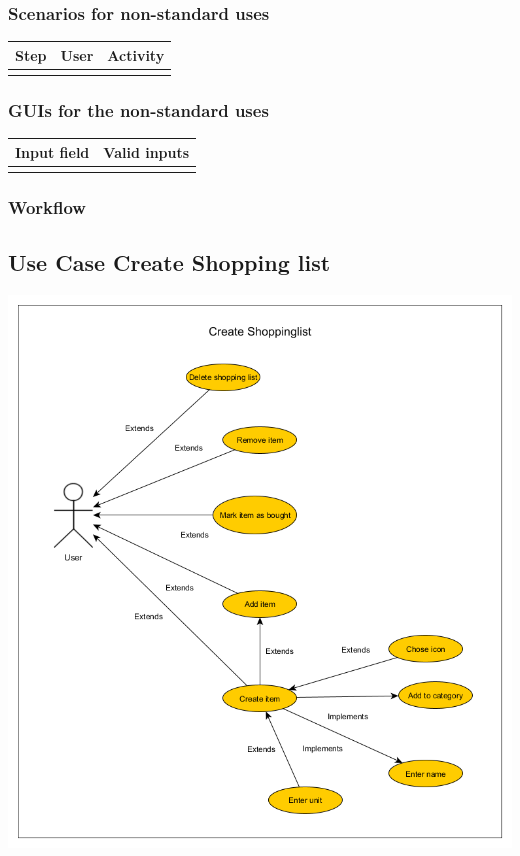 \documentclass[12pt]{article}
\theoremstyle{definition}
\begin{document}
\subsubsection{Scenarios for non-standard uses}

\begin{tabular}{|l|l|l|}
\hline
Step & User & Activity \\ \hline
 & & \\ \hline
\end{tabular}

\subsubsection{GUIs for the non-standard uses}

\begin{tabular}{|l|l|}
\hline
Input field & Valid inputs \\ \hline
 &  \\ \hline
\end{tabular}

\subsubsection{Workflow}

\subsection{Use Case Create Shopping list}

\includegraphics[scale=.5]{UseCaseCreateShoppinglist.png}\\
\end{document}
